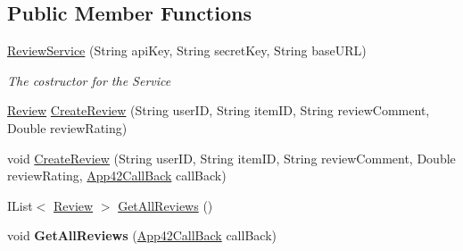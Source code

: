 \subsection*{Public Member Functions}
\begin{DoxyCompactItemize}
\item 
\hyperlink{classcom_1_1shephertz_1_1app42_1_1paas_1_1sdk_1_1csharp_1_1review_1_1_review_service_a2c5661433e80e92a78974b8048daa5e8}{Review\+Service} (String api\+Key, String secret\+Key, String base\+U\+R\+L)
\begin{DoxyCompactList}\small\item\em The costructor for the Service \end{DoxyCompactList}\item 
\hyperlink{classcom_1_1shephertz_1_1app42_1_1paas_1_1sdk_1_1csharp_1_1review_1_1_review}{Review} \hyperlink{classcom_1_1shephertz_1_1app42_1_1paas_1_1sdk_1_1csharp_1_1review_1_1_review_service_a941d9c7a9ccc50dfa51211f0d68611f3}{Create\+Review} (String user\+I\+D, String item\+I\+D, String review\+Comment, Double review\+Rating)
\item 
void \hyperlink{classcom_1_1shephertz_1_1app42_1_1paas_1_1sdk_1_1csharp_1_1review_1_1_review_service_a7b4c0f9f0b2466ce85998525466496c4}{Create\+Review} (String user\+I\+D, String item\+I\+D, String review\+Comment, Double review\+Rating, \hyperlink{interfacecom_1_1shephertz_1_1app42_1_1paas_1_1sdk_1_1csharp_1_1_app42_call_back}{App42\+Call\+Back} call\+Back)
\item 
I\+List$<$ \hyperlink{classcom_1_1shephertz_1_1app42_1_1paas_1_1sdk_1_1csharp_1_1review_1_1_review}{Review} $>$ \hyperlink{classcom_1_1shephertz_1_1app42_1_1paas_1_1sdk_1_1csharp_1_1review_1_1_review_service_a11b73454e19c810bf898e354670e45f8}{Get\+All\+Reviews} ()
\item 
\hypertarget{classcom_1_1shephertz_1_1app42_1_1paas_1_1sdk_1_1csharp_1_1review_1_1_review_service_ae4463884f0956752f8dbcf08eb0b1dbd}{void {\bfseries Get\+All\+Reviews} (\hyperlink{interfacecom_1_1shephertz_1_1app42_1_1paas_1_1sdk_1_1csharp_1_1_app42_call_back}{App42\+Call\+Back} call\+Back)}\label{classcom_1_1shephertz_1_1app42_1_1paas_1_1sdk_1_1csharp_1_1review_1_1_review_service_ae4463884f0956752f8dbcf08eb0b1dbd}


\end{DoxyCompactItemize}

